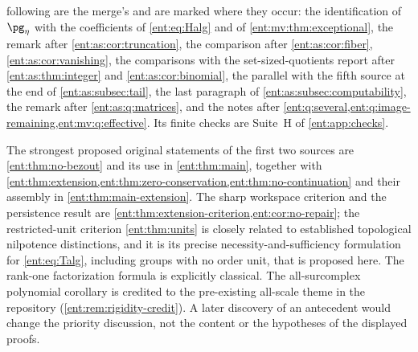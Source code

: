 \documentclass[11pt]{article}
\theoremstyle{plain}
\theoremstyle{plain}
\theoremstyle{plain}
\theoremstyle{definition}
\theoremstyle{definition}
\theoremstyle{definition}
\theoremstyle{definition}
\theoremstyle{remark}
\begin{document}
following are the merge's and are marked where they occur: the identification
of $\pg_\eta$ with the coefficients of \eqref{ent:eq:Halg} and of
\cref{ent:mv:thm:exceptional}, the remark after \cref{ent:as:cor:truncation},
the comparison after \cref{ent:as:cor:fiber}, \cref{ent:as:cor:vanishing}, the
comparisons with the set-sized-quotients report after \cref{ent:as:thm:integer}
and \cref{ent:as:cor:binomial}, the parallel with the fifth source at the end of
\cref{ent:as:subsec:tail}, the last paragraph of
\cref{ent:as:subsec:computability}, the remark after \cref{ent:as:q:matrices},
and the notes after \cref{ent:q:several,ent:q:image-remaining,ent:mv:q:effective}.
Its finite checks are Suite~H of \cref{ent:app:checks}.

The strongest proposed original statements of the first two sources are
\cref{ent:thm:no-bezout} and its use in \cref{ent:thm:main}, together with
\cref{ent:thm:extension,ent:thm:zero-conservation,ent:thm:no-continuation}
and their assembly in \cref{ent:thm:main-extension}. The sharp workspace
criterion and the persistence result are
\cref{ent:thm:extension-criterion,ent:cor:no-repair}; the restricted-unit
criterion \cref{ent:thm:units} is closely related to established topological
nilpotence distinctions, and it is its precise necessity-and-sufficiency
formulation for \eqref{ent:eq:Talg}, including groups with no order unit,
that is proposed here. The rank-one factorization formula is explicitly
classical. The all-surcomplex polynomial corollary is credited to the
pre-existing all-scale theme in the repository
(\cref{ent:rem:rigidity-credit}). A later discovery of an antecedent would
change the priority discussion, not the content or the hypotheses of the
displayed proofs.
\end{document}
